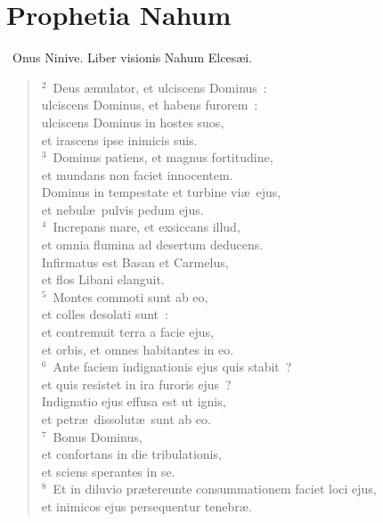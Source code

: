 \clearpage
{\centering \section*{Prophetia Nahum}}\thispagestyle{empty}

~Onus Ninive. Liber visionis Nahum Elces\ae i.


\begin{flushleft}\begin{verse}\vspace{6pt}${}^{2}$~Deus \ae mulator, et ulciscens Dominus~:\\ ulciscens Dominus, et habens furorem~:\\ ulciscens Dominus in hostes suos,\\ et irascens ipse inimicis suis.\\
${}^{3}$~Dominus patiens, et magnus fortitudine,\\ et mundans non faciet innocentem.\\ Dominus in tempestate et turbine vi\ae\ ejus,\\ et nebul\ae\ pulvis pedum ejus.\\
${}^{4}$~Increpans mare, et exsiccans illud,\\ et omnia flumina ad desertum deducens.\\ Infirmatus est Basan et Carmelus,\\ et flos Libani elanguit.\\
${}^{5}$~Montes commoti sunt ab eo,\\ et colles desolati sunt~:\\ et contremuit terra a facie ejus,\\ et orbis, et omnes habitantes in eo.\\
${}^{6}$~Ante faciem indignationis ejus quis stabit~?\\ et quis resistet in ira furoris ejus~?\\ Indignatio ejus effusa est ut ignis,\\ et petr\ae\ dissolut\ae\ sunt ab eo.\\
${}^{7}$~Bonus Dominus,\\ et confortans in die tribulationis,\\ et sciens sperantes in se.\\
${}^{8}$~Et in diluvio pr\ae tereunte consummationem faciet loci ejus,\\ et inimicos ejus persequentur tenebr\ae .\\

\end{verse}
\end{flushleft}
